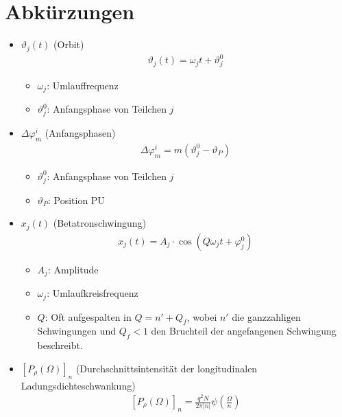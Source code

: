 \documentclass[12pt]{article}%
\renewcommand{\phi}{\varphi}
\renewcommand{\theta}{\vartheta}
\begin{document}
\section{Abkürzungen}

\begin{itemize}

\item $\theta_j(t)$ (Orbit)
\begin{align}
\label{eq:theta_j}\theta_j(t) = \omega_j t + \theta_j^0
\end{align}

	\begin{itemize}
	
	\item $\omega_j$: Umlauffrequenz
	\item $\theta_j^0$: Anfangsphase von Teilchen $j$
	
	\end{itemize}

\item $\Delta \phi_m^i$ (Anfangsphasen)
\begin{align}
\label{delta_phi}\Delta \phi_m^i = m (\theta_j^0 - \theta_P)
\end{align}
	\begin{itemize}
	
	\item \emph{$\theta_j^0$}: Anfangsphase von Teilchen $j$
	\item \emph{$\theta_P$}: Position PU
	
	\end{itemize}

\item $x_j(t)$ (Betatronschwingung)
\begin{align} \label{eq:betatron_x}
	x_j(t) = A_j \cdot \cos (Q \omega_j t + \phi_j^0)
\end{align}

	\begin{itemize}
	
	\item $A_j$: Amplitude
	\item $\omega_j$: Umlaufkreisfrequenz
	\item $Q$: Oft aufgespalten in $Q = n' + Q_f$, wobei $n'$ die ganzzahligen Schwingungen und $Q_f < 1$ den Bruchteil der angefangenen Schwingung beschreibt.
	
	\end{itemize}

\item $[P_\rho(\Omega)]_n$ (Durchschnittsintensität der longitudinalen Ladungsdichteschwankung)
\begin{align} \label{eq:average_power_longitudinal_charge_density_fluktuation}
	[P_\rho(\Omega)]_n = \frac{q^2N}{2\pi |n|} \psi\left(\frac{\Omega}{n}\right)
\end{align}

\end{itemize}
\end{document}
